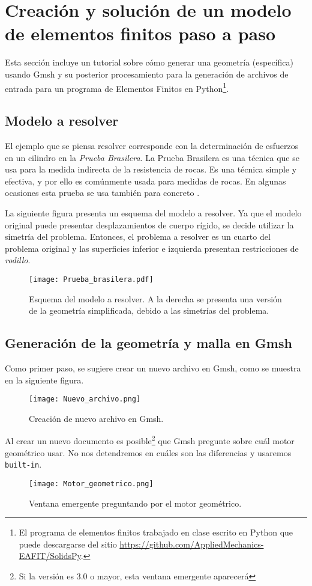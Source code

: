 \section{Creación y solución de un modelo de elementos finitos paso a paso}
Esta sección incluye un tutorial sobre cómo generar una geometría (específica) usando Gmsh y su posterior procesamiento para la generación de archivos de entrada para un programa de Elementos Finitos en Python\footnote{El programa de elementos finitos trabajado en clase escrito en Python que puede descargarse del sitio \url{https://github.com/AppliedMechanics-EAFIT/SolidsPy}.}.

\subsection{Modelo a resolver}
El ejemplo que se piensa resolver corresponde con la determinación de esfuerzos en un cilindro en la \emph{Prueba Brasilera}. La Prueba Brasilera  es una técnica que se usa para la medida indirecta de la resistencia de rocas. Es una técnica simple y efectiva, y por ello es comúnmente usada para medidas de rocas. En algunas ocasiones esta prueba se usa también para concreto \cite{brazilian_test}.

La siguiente figura presenta un esquema del modelo a resolver. Ya que el modelo original puede presentar desplazamientos de cuerpo rígido, se decide utilizar la simetría del problema. Entonces, el problema a resolver es un cuarto del problema original y las superficies inferior e izquierda presentan restricciones de \emph{rodillo}.
\begin{figure}[H]
    \centering
    \texttt{[image: Prueba\_brasilera.pdf]}
    \caption{Esquema del modelo a resolver. A la derecha se presenta una versión de la geometría simplificada, debido a las simetrías del problema.}
\end{figure}

\subsection{Generación de la geometría y malla en Gmsh}
Como primer paso, se sugiere crear un nuevo archivo en Gmsh, como se muestra en la siguiente figura.
\begin{figure}[H]
    \centering
    \texttt{[image: Nuevo\_archivo.png]}
    \caption{Creación de nuevo archivo en Gmsh.}
\end{figure}

Al crear un nuevo documento es posible\footnote{Si la versión es 3.0 o mayor, esta ventana emergente aparecerá} que Gmsh pregunte sobre cuál motor geométrico usar. No nos detendremos en cuáles son las diferencias y usaremos \texttt{built-in}.
\begin{figure}[H]
    \centering
    \texttt{[image: Motor\_geometrico.png]}
    \caption{Ventana emergente preguntando por el motor geométrico.}
\end{figure}

